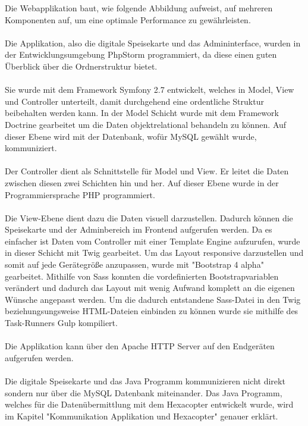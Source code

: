 Die Webapplikation baut, wie folgende Abbildung aufweist, auf mehreren Komponenten auf, um eine optimale Performance zu gewährleisten.\\ \\
Die Applikation, also die digitale Speisekarte und das Admininterface, wurden in der Entwicklungsumgebung PhpStorm programmiert, da diese einen guten Überblick über die Ordnerstruktur bietet.\\ \\
Sie wurde mit dem Framework Symfony 2.7 entwickelt, welches in Model, View und Controller unterteilt, damit durchgehend eine ordentliche Struktur beibehalten werden kann.
In der Model Schicht wurde mit dem Framework Doctrine gearbeitet um die Daten objektrelational behandeln zu können. Auf dieser Ebene wird mit der Datenbank, wofür MySQL gewählt wurde, kommuniziert.\\ \\
Der Controller dient als Schnittstelle für Model und View. Er leitet die Daten zwischen diesen zwei Schichten hin und her. Auf dieser Ebene wurde in der Programmiersprache PHP programmiert.\\ \\
Die View-Ebene dient dazu die Daten visuell darzustellen. Dadurch können die Speisekarte und der Adminbereich im Frontend aufgerufen werden. Da es einfacher ist Daten vom Controller mit einer Template Engine aufzurufen, wurde in dieser Schicht mit Twig gearbeitet. Um das Layout responsive darzustellen und somit auf jede Gerätegröße anzupassen, wurde mit "Bootstrap 4 alpha" gearbeitet. Mithilfe von Sass konnten die vordefinierten Bootstrapvariablen verändert und dadurch das Layout mit wenig Aufwand komplett an die eigenen Wünsche angepasst werden. 
Um die dadurch entstandene Sass-Datei in den Twig beziehungsungsweise HTML-Dateien einbinden zu können wurde sie mithilfe des Task-Runners Gulp kompiliert.\\ \\
Die Applikation kann über den Apache HTTP Server auf den Endgeräten aufgerufen werden. \\ \\
Die digitale Speisekarte und das Java Programm kommunizieren nicht direkt sondern nur über die MySQL Datenbank miteinander. Das Java Programm, welches für die Datenübermittlung mit dem Hexacopter entwickelt wurde, wird im Kapitel "Kommunikation Applikation und Hexacopter" genauer erklärt.

